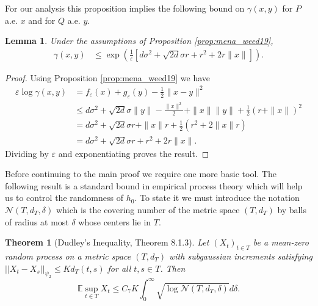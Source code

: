 \documentclass{article}
\newtheorem{lemma}{Lemma}
\newtheorem{theorem}{Theorem}
\theoremstyle{definition}
\newcommand{\feps}{f_\varepsilon}
\newcommand{\geps}{g_\varepsilon}
\begin{document}
For our analysis this proposition implies the following bound on $\gamma(x,y)$ for $P$ a.e. $x$ and for $Q$ a.e. $y$. 
\begin{lemma}
\label{lem:subg_ub_gamma}
Under the assumptions of Proposition \ref{prop:mena_weed19},
\begin{align*}
     \gamma(x,y) & \leq \exp \left (\frac{1}{\varepsilon} \left [ d \sigma^2 + \sqrt{2 d} \sigma r + r^2 +  2r\|x\| \right ] \right ).
\end{align*}
\end{lemma}
\begin{proof}
    Using Proposition \ref{prop:mena_weed19} we have
    \begin{align*}
    \varepsilon \log \gamma(x,y) & = \feps(x) + \geps(y) - \frac{1}{2} \| x - y\|^2 \\ 
    & \leq d \sigma^2 + \sqrt{2 d} \sigma \|y\|  - \frac{\|x\|^2}{2} + \|x\| \|y\| + \frac{1}{2} (r + \|x\|)^2 \\
    & = d \sigma^2 + \sqrt{2 d} \sigma r + \|x\|r + \frac{1}{2}(r^2 + 2 \|x\| r) \\
    & = d \sigma^2 + \sqrt{2 d} \sigma r + r^2 + 2r\|x\|.
\end{align*}
Dividing by $\varepsilon$ and exponentiating proves the result.
\end{proof}

Before continuing to the main proof we require one more basic tool. The following result is a standard bound in empirical process theory which will help us to control the randomness of $h_0$. To state it we must introduce the notation $\mathcal{N}(T,d_T,\delta)$ which is the covering number of the metric space $(T,d_T)$ by balls of radius at most $\delta$ whose centers lie in $T$.

\begin{theorem}[Dudley's Inequality, \cite{vershynin2018high} Theorem 8.1.3] \label{thm:hdp_chain}
    Let $(X_t)_{t\in T}$ be a mean-zero random process on a metric space $(T,d_T)$ with subgaussian increments satisfying $||X_t - X_s||_{\psi_2} \leq Kd_T(t,s)$ for all $t,s \in T$. Then
    \begin{equation*}
        \mathbb{E}\sup_{t \in T} X_t \leq C_7K \int_0^\infty \sqrt{\log \mathcal{N}(T,d_T,\delta)} d\delta.
    \end{equation*}
\end{theorem}
\end{document}
